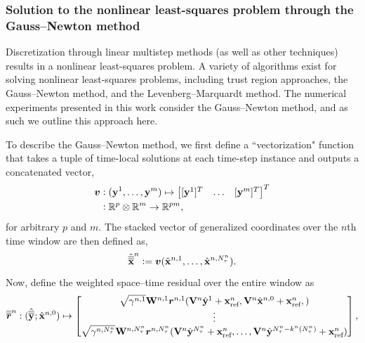\subsubsection{Solution to the nonlinear least-squares problem through the Gauss--Newton method}
Discretization through linear multistep methods (as well as other techniques) 
results in a nonlinear least-squares problem.
A variety of algorithms exist for solving nonlinear  
least-squares problems, including trust region approaches, the Gauss–Newton method, and the Levenberg–Marquardt method.  
The numerical experiments presented in this work consider the Gauss--Newton method, and as such we outline this approach here. 

To describe the Gauss--Newton method, we first define a ``vectorization" function that takes a tuple of time-local solutions at each time-step instance and outputs 
a concatenated vector, 
\begin{align*}
 \boldsymbol v &\vcentcolon (\mathbf{y}^{1},\ldots,\mathbf{y}^{m} ) \mapsto \begin{bmatrix} [\mathbf{y}^{1}]^T & \ldots & [\mathbf{y}^{m}]^T \end{bmatrix}^T  \\
&\vcentcolon \mathbb{R}^{p} \otimes \mathbb{R}^{m} \rightarrow \mathbb{R}^{pm},
\end{align*}
for arbitrary $p$ and $m$. The stacked vector of generalized coordinates over the $n$th time window are then defined as, 
\begin{equation*}
\hat{\overline{\overline{\mathbf {x}}}}^{n} \vcentcolon= 
\boldsymbol v (\hat{\mathbf{x}}^{n,1},\ldots,\hat{\mathbf{x}}^{n,N_{\tau}^{n}} ).
\end{equation*}
Now, define the weighted space--time residual over the entire window as
\begin{equation*}
\overline{\overline{\boldsymbol r}}^{n}_{\text{}} : (\hat{\overline{\overline{\mathbf{y}}}}^{};\hat{\mathbf{x}}^{n,0}) \mapsto \begin{bmatrix}
 \sqrt{\gamma^{n,1} } \mathbf{W}^{n,1} \boldsymbol r_{}^{n,1}( \mathbf {V}^{n} \hat{\mathbf{y}}^{1} + \mathbf{x}_\text{ref}^{n},  \mathbf {V}^{n} \hat{\mathbf{x}}^{n,0} + \mathbf{x}_\text{ref}^{n},) \\
\vdots \\
 \sqrt{\gamma^{n,N_{\tau}^{n}} } \mathbf{W}^{n,N_{\tau}^{n}} \boldsymbol r_{}^{n,N_{\tau}^{n}}( \mathbf {V}^{n} \hat{\mathbf{y}}^{N_{\tau}^{n}} + \mathbf{x}_\text{ref}^{n}, \ldots,\mathbf {V}^{n} \hat{\mathbf{y}}^{N_{\tau}^{n} - k^n(N_{\tau}^{n}) } + \mathbf{x}_\text{ref}^{n}) \\
\end{bmatrix},
\end{equation*}
